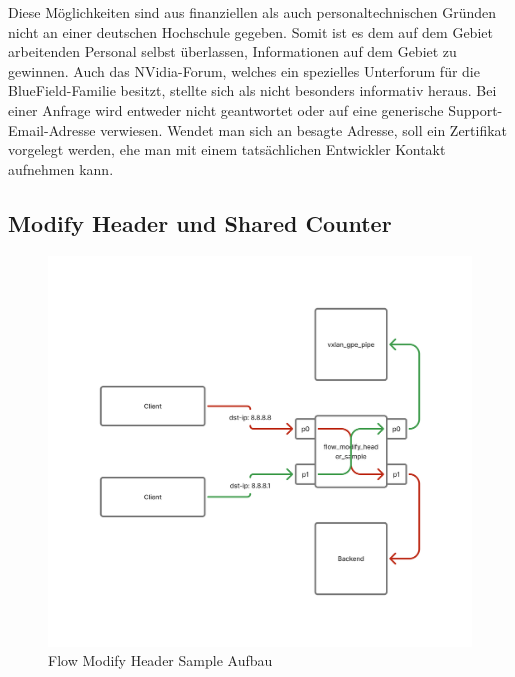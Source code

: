 Diese Möglichkeiten sind aus finanziellen als auch personaltechnischen Gründen nicht an einer deutschen Hochschule gegeben. Somit ist es dem auf dem Gebiet arbeitenden Personal selbst überlassen, Informationen auf dem Gebiet zu gewinnen. Auch das NVidia-Forum, welches ein spezielles Unterforum für die BlueField-Familie besitzt, stellte sich als nicht besonders informativ heraus. Bei einer Anfrage wird entweder nicht geantwortet oder auf eine generische Support-Email-Adresse verwiesen. Wendet man sich an besagte Adresse, soll ein Zertifikat vorgelegt werden, ehe man mit einem tatsächlichen Entwickler Kontakt aufnehmen kann.\newline

\subsection{Modify Header und Shared Counter}
\begin{figure}
    \centering
    \includegraphics[width=1\linewidth]{images/modify_header.png}
    \caption{Flow Modify Header Sample Aufbau}
    \label{fig:enter-label}
\end{figure}

